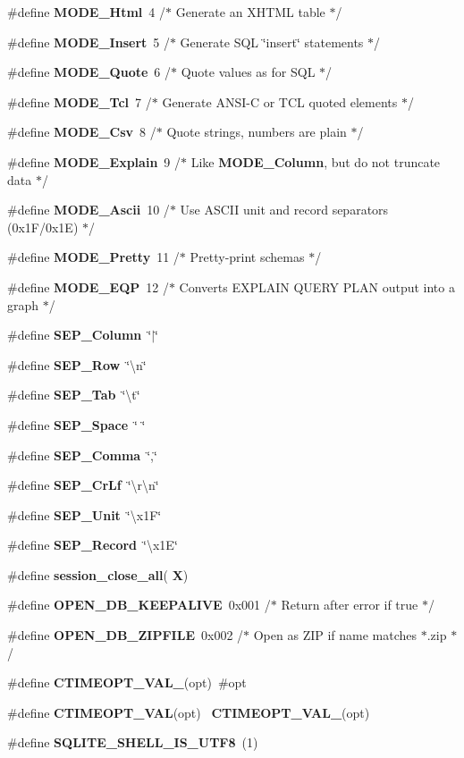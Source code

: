 \begin{DoxyCompactItemize}
\item 
\#define \textbf{ M\+O\+D\+E\+\_\+\+Html}~4  /$\ast$ Generate an X\+H\+T\+ML table $\ast$/
\item 
\#define \textbf{ M\+O\+D\+E\+\_\+\+Insert}~5  /$\ast$ Generate S\+QL \char`\"{}insert\char`\"{} statements $\ast$/
\item 
\#define \textbf{ M\+O\+D\+E\+\_\+\+Quote}~6  /$\ast$ Quote values as for S\+QL $\ast$/
\item 
\#define \textbf{ M\+O\+D\+E\+\_\+\+Tcl}~7  /$\ast$ Generate A\+N\+SI-\/C or T\+CL quoted elements $\ast$/
\item 
\#define \textbf{ M\+O\+D\+E\+\_\+\+Csv}~8  /$\ast$ Quote strings, numbers are plain $\ast$/
\item 
\#define \textbf{ M\+O\+D\+E\+\_\+\+Explain}~9  /$\ast$ Like \textbf{ M\+O\+D\+E\+\_\+\+Column}, but do not truncate data $\ast$/
\item 
\#define \textbf{ M\+O\+D\+E\+\_\+\+Ascii}~10  /$\ast$ Use A\+S\+C\+II unit and record separators (0x1\+F/0x1\+E) $\ast$/
\item 
\#define \textbf{ M\+O\+D\+E\+\_\+\+Pretty}~11  /$\ast$ Pretty-\/print schemas $\ast$/
\item 
\#define \textbf{ M\+O\+D\+E\+\_\+\+E\+QP}~12  /$\ast$ Converts E\+X\+P\+L\+A\+IN Q\+U\+E\+RY P\+L\+AN output into a graph $\ast$/
\item 
\#define \textbf{ S\+E\+P\+\_\+\+Column}~\char`\"{}$\vert$\char`\"{}
\item 
\#define \textbf{ S\+E\+P\+\_\+\+Row}~\char`\"{}\textbackslash{}n\char`\"{}
\item 
\#define \textbf{ S\+E\+P\+\_\+\+Tab}~\char`\"{}\textbackslash{}t\char`\"{}
\item 
\#define \textbf{ S\+E\+P\+\_\+\+Space}~\char`\"{} \char`\"{}
\item 
\#define \textbf{ S\+E\+P\+\_\+\+Comma}~\char`\"{},\char`\"{}
\item 
\#define \textbf{ S\+E\+P\+\_\+\+Cr\+Lf}~\char`\"{}\textbackslash{}r\textbackslash{}n\char`\"{}
\item 
\#define \textbf{ S\+E\+P\+\_\+\+Unit}~\char`\"{}\textbackslash{}x1F\char`\"{}
\item 
\#define \textbf{ S\+E\+P\+\_\+\+Record}~\char`\"{}\textbackslash{}x1E\char`\"{}
\item 
\#define \textbf{ session\+\_\+close\+\_\+all}(\textbf{ X})
\item 
\#define \textbf{ O\+P\+E\+N\+\_\+\+D\+B\+\_\+\+K\+E\+E\+P\+A\+L\+I\+VE}~0x001   /$\ast$ Return after error if true $\ast$/
\item 
\#define \textbf{ O\+P\+E\+N\+\_\+\+D\+B\+\_\+\+Z\+I\+P\+F\+I\+LE}~0x002   /$\ast$ Open as Z\+I\+P if name matches $\ast$.\+zip $\ast$/
\item 
\#define \textbf{ C\+T\+I\+M\+E\+O\+P\+T\+\_\+\+V\+A\+L\+\_\+}(opt)~\#opt
\item 
\#define \textbf{ C\+T\+I\+M\+E\+O\+P\+T\+\_\+\+V\+AL}(opt)~\textbf{ C\+T\+I\+M\+E\+O\+P\+T\+\_\+\+V\+A\+L\+\_\+}(opt)
\item 
\#define \textbf{ S\+Q\+L\+I\+T\+E\+\_\+\+S\+H\+E\+L\+L\+\_\+\+I\+S\+\_\+\+U\+T\+F8}~(1)
\end{DoxyCompactItemize}
